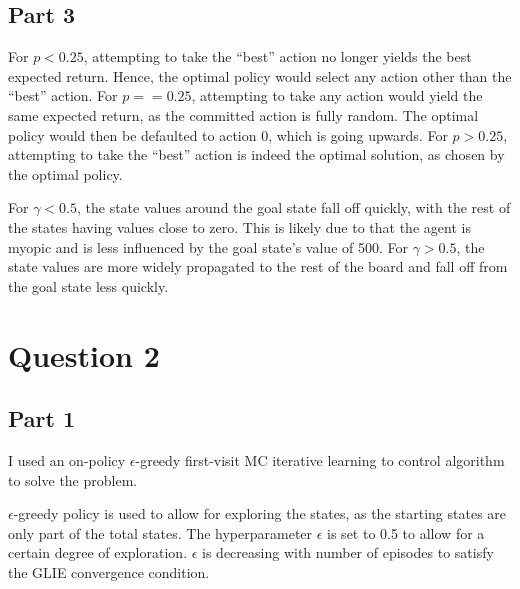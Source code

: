\documentclass{article}
\begin{document}
    \subsection{Part 3}\label{subsec:question-1-3}
    For $p < 0.25$, attempting to take the ``best'' action no longer yields the best expected return.
    Hence, the optimal policy would select any action other than the ``best'' action.
    For $p == 0.25$, attempting to take any action would yield the same expected return, as the committed action is fully random.
    The optimal policy would then be defaulted to action 0, which is going upwards.
    For $p > 0.25$, attempting to take the ``best'' action is indeed the optimal solution, as chosen by the optimal policy.

    For $\gamma < 0.5$, the state values around the goal state fall off quickly, with the rest of the states having values close to zero.
    This is likely due to that the agent is myopic and is less influenced by the goal state's value of 500.
    For $\gamma > 0.5$, the state values are more widely propagated to the rest of the board and fall off from the goal state less quickly.


    \section{Question 2}

    \subsection{Part 1}
    I used an on-policy $\epsilon$-greedy first-visit MC iterative learning to control algorithm to solve the problem.

    $\epsilon$-greedy policy is used to allow for exploring the states, as the starting states are only part of the total states.
    The hyperparameter $\epsilon$ is set to 0.5 to allow for a certain degree of exploration.
    $\epsilon$ is decreasing with number of episodes to satisfy the GLIE convergence condition.
\end{document}
